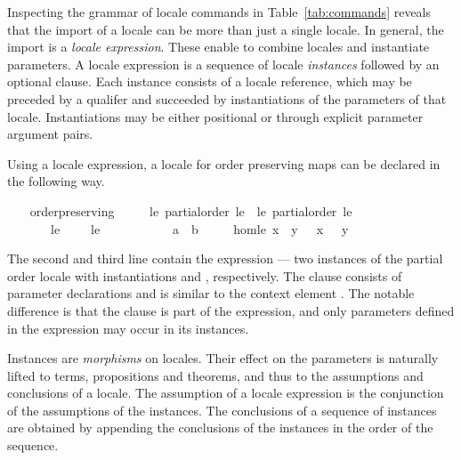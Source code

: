 \begin{isabellebody}
\begin{isamarkuptext}
  Inspecting the grammar of locale commands in
  Table~\ref{tab:commands} reveals that the import of a locale can be
  more than just a single locale.  In general, the import is a
  \emph{locale expression}.  These enable to combine locales
  and instantiate parameters.  A locale expression is a sequence of
  locale \emph{instances} followed by an optional 
  clause.  Each instance consists of a locale reference, which may be
  preceded by a qualifer and succeeded by instantiations of the
  parameters of that locale.  Instantiations may be either positional
  or through explicit parameter argument pairs.

  Using a locale expression, a locale for order
  preserving maps can be declared in the following way.%
\end{isamarkuptext}%
\isamarkuptrue%
\ \ \isamarkupfalse%
\ order{\isacharunderscore}preserving\ {\isacharequal}\isanewline
\ \ \ \ le{\isacharcolon}\ partial{\isacharunderscore}order\ le\ {\isacharplus}\ le{\isacharprime}{\isacharcolon}\ partial{\isacharunderscore}order\ le{\isacharprime}\isanewline
\ \ \ \ \ \ \ le\ {\isacharparenleft}\ {\isachardoublequoteopen}{\isasymsqsubseteq}{\isachardoublequoteclose}\ {}{}{\isacharparenright}\ \ le{\isacharprime}\ {\isacharparenleft}\ {\isachardoublequoteopen}{\isasympreceq}{\isachardoublequoteclose}\ {}{}{\isacharparenright}\ {\isacharplus}\isanewline
\ \ \ \ \ {\isasymphi}\ {\isacharcolon}{\isacharcolon}\ {\isachardoublequoteopen}{\isacharprime}a\ {\isasymRightarrow}\ {\isacharprime}b{\isachardoublequoteclose}\isanewline
\ \ \ \ \ hom{\isacharunderscore}le{\isacharcolon}\ {\isachardoublequoteopen}x\ {\isasymsqsubseteq}\ y\ {\isasymLongrightarrow}\ {\isasymphi}\ x\ {\isasympreceq}\ {\isasymphi}\ y{\isachardoublequoteclose}%
\begin{isamarkuptext}%
The second and third line contain the expression --- two
  instances of the partial order locale with instantiations 
  and , respectively.  The  clause consists
  of parameter declarations and is similar to the context element
  .  The notable difference is that the
   clause is part of the expression, and only
  parameters defined in the expression may occur in its instances.

  Instances are \emph{morphisms} on locales.  Their effect on the
  parameters is naturally lifted to terms, propositions and theorems,
  and thus to the assumptions and conclusions of a locale.  The
  assumption of a locale expression is the conjunction of the
  assumptions of the instances.  The conclusions of a sequence of
  instances are obtained by appending the conclusions of the
  instances in the order of the sequence.


\end{isamarkuptext}
\end{isabellebody}
